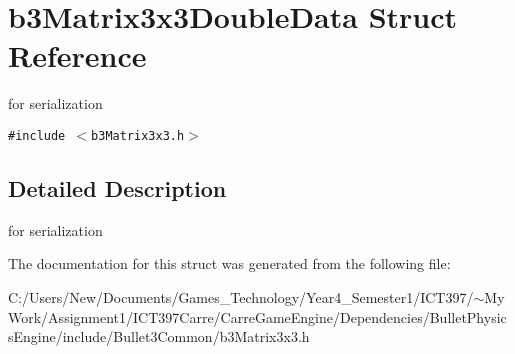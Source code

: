 \hypertarget{structb3_matrix3x3_double_data}{
\section{b3Matrix3x3DoubleData Struct Reference}
\label{structb3_matrix3x3_double_data}
}
for serialization  


{\tt \#include $<$b3Matrix3x3.h$>$}



\subsection{Detailed Description}
for serialization 

The documentation for this struct was generated from the following file:\begin{CompactItemize}
\item 
C:/Users/New/Documents/Games\_\-Technology/Year4\_\-Semester1/ICT397/$\sim$My Work/Assignment1/ICT397Carre/CarreGameEngine/Dependencies/BulletPhysicsEngine/include/Bullet3Common/b3Matrix3x3.h\end{CompactItemize}

